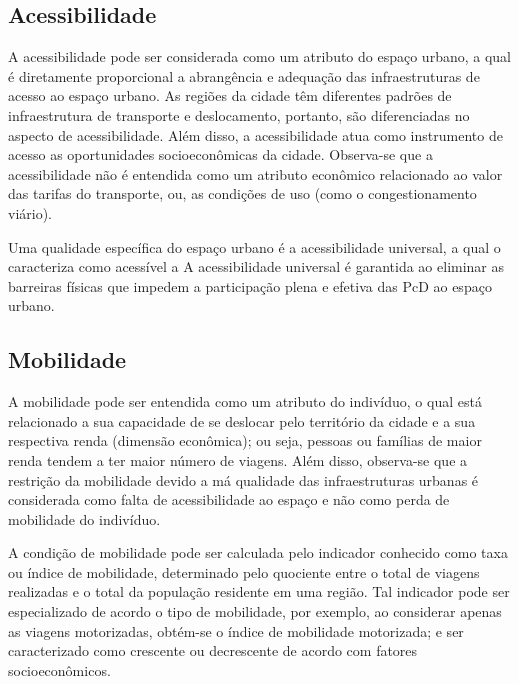 \documentclass[
	12pt,				%
	oneside,			%
	a4paper,			%
	english,			%
	brazil				%
	]{abntex2ppgsi}
\begin{document}
{\subsection{Acessibilidade}
A acessibilidade pode ser considerada como um atributo do espaço urbano, a qual é diretamente proporcional a abrangência e adequação das infraestruturas de acesso ao espaço urbano. As regiões da cidade têm diferentes padrões de infraestrutura de transporte e deslocamento, portanto, são diferenciadas no aspecto de acessibilidade. Além disso, a acessibilidade atua como instrumento de acesso as oportunidades socioeconômicas da cidade. Observa-se que a acessibilidade não é entendida como um atributo econômico relacionado ao valor das tarifas do transporte, ou, as condições de uso (como o congestionamento viário).

Uma qualidade específica do espaço urbano é a acessibilidade universal, a qual o caracteriza como acessível a  A acessibilidade universal é garantida ao eliminar as barreiras físicas que impedem a participação plena e efetiva das PcD ao espaço urbano.

\subsection{Mobilidade}

A mobilidade pode ser entendida como um atributo do indivíduo, o qual está relacionado a sua capacidade de se deslocar pelo território da cidade e a sua respectiva renda (dimensão econômica); ou seja, pessoas ou famílias de maior renda tendem a ter maior número de viagens. Além disso, observa-se que a restrição da mobilidade devido a má qualidade das infraestruturas urbanas é considerada como falta de acessibilidade ao espaço e não como perda de mobilidade do indivíduo.

A condição de mobilidade pode ser calculada pelo indicador conhecido como taxa ou índice de mobilidade, determinado pelo quociente entre o total de viagens realizadas e o total da população residente em uma região. Tal indicador pode ser especializado de acordo o tipo de mobilidade, por exemplo, ao considerar apenas as viagens motorizadas, obtém-se o índice de mobilidade motorizada; e ser caracterizado como crescente ou decrescente de acordo com fatores socioeconômicos.

}
\end{document}
